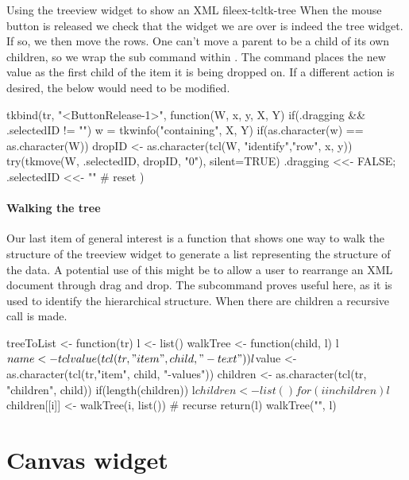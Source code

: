 \begin{example}{Using the treeview widget to show an XML file}{ex-tcltk-tree}
When the mouse button is released we check that the widget we are over
is indeed the tree widget. If so, we then move the rows. One can't
move a parent to be a child of its own children, so we wrap the
 sub command within . The
 command places the new value as the first child of the
item it is being dropped on. If a different action is desired, the
 below would need to be modified.
\begin{Schunk}
\begin{Sinput}
 tkbind(tr, "<ButtonRelease-1>", function(W, x, y, X, Y) {
   if(.dragging && .selectedID != "") {
     w = tkwinfo("containing", X, Y)
     if(as.character(w) == as.character(W)) {
       dropID <- as.character(tcl(W, "identify","row", x, y))
       try(tkmove(W, .selectedID, dropID, "0"), silent=TRUE)
     }
   }
   .dragging <<- FALSE; .selectedID <<- "" # reset
 })
\end{Sinput}
\end{Schunk}

\paragraph{Walking the tree}
Our last item of general interest is a function that shows one way to
walk the structure of the treeview widget to generate a list
representing the structure of the data.  A potential use of this might
be to allow a user to rearrange an XML document through drag and drop.
The subcommand  proves useful here,
as it is used to identify the hierarchical structure. When there are children a recursive call is made.



\begin{Schunk}
\begin{Sinput}
 treeToList <- function(tr) {
   l <- list()
   walkTree <- function(child, l) {
     l$name <- tclvalue(tcl(tr,"item", child, "-text"))
     l$value <- as.character(tcl(tr,"item", child, "-values"))
     children <- as.character(tcl(tr, "children", child)) 
     if(length(children)) {
       l$children <- list()
       for(i in children) 
         l$children[[i]] <- walkTree(i, list()) # recurse
     }
     return(l)
   }
   walkTree("", l)
 }
 
\end{Sinput}
\end{Schunk}
\end{example}

\section{Canvas widget}
\label{sec:tcltk:canvas-widget}

